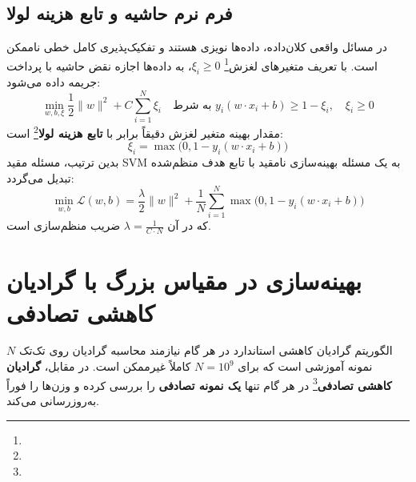 \subsection{فرم نرم حاشیه و تابع هزینه لولا \texorpdfstring{}{(Hinge Loss)}}
در مسائل واقعی کلان‌داده، داده‌ها نویزی هستند و تفکیک‌پذیری کامل خطی ناممکن است. با تعریف متغیرهای لغزش\footnote{} $\xi_i \ge 0$، به داده‌ها اجازه نقض حاشیه با پرداخت جریمه داده می‌شود:
\begin{equation}
\min_{w, b, \xi} \frac{1}{2} \|w\|^2 + C \sum_{i=1}^N \xi_i \quad \text{به شرط } y_i(w \cdot x_i + b) \ge 1 - \xi_i , \quad \xi_i \ge 0
\end{equation}
مقدار بهینه متغیر لغزش دقیقاً برابر با \textbf{تابع هزینه لولا}\footnote{} است:
\begin{equation}
\xi_i = \max\Big(0, 1 - y_i (w \cdot x_i + b)\Big)
\end{equation}
بدین ترتیب، مسئله مقید SVM به یک مسئله بهینه‌سازی نامقید با تابع هدف منظم‌شده تبدیل می‌گردد:
\begin{equation}
\min_{w, b} \mathcal{L}(w, b) = \frac{\lambda}{2} \|w\|^2 + \frac{1}{N} \sum_{i=1}^N \max\Big(0, 1 - y_i (w \cdot x_i + b)\Big)
\end{equation}
که در آن $\lambda = \frac{1}{C \cdot N}$ ضریب منظم‌سازی است.

\section{بهینه‌سازی در مقیاس بزرگ با گرادیان کاهشی تصادفی \texorpdfstring{}{(SGD)}}
الگوریتم گرادیان کاهشی استاندارد  در هر گام نیازمند محاسبه گرادیان روی تک‌تک $N$ نمونه آموزشی است که برای $N = 10^9$ کاملاً غیرممکن است.
در مقابل، \textbf{گرادیان کاهشی تصادفی}\footnote{} در هر گام تنها \textbf{یک نمونه تصادفی} را بررسی کرده و وزن‌ها را فوراً به‌روزرسانی می‌کند.

